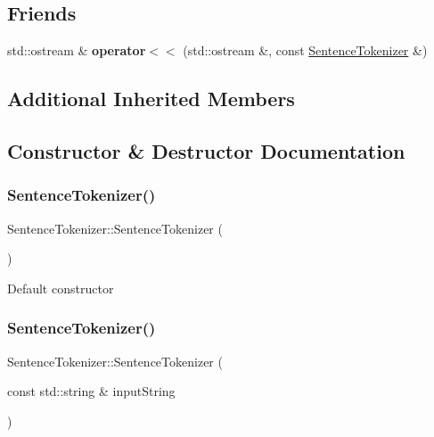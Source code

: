 \subsection*{Friends}
\begin{DoxyCompactItemize}
\item 
\mbox{\label{classSentenceTokenizer_a2998282df2f8bc7eb4c49617879f9256}} 
std\+::ostream \& {\bfseries operator$<$$<$} (std\+::ostream \&, const \hyperlink{classSentenceTokenizer}{Sentence\+Tokenizer} \&)
\end{DoxyCompactItemize}
\subsection*{Additional Inherited Members}


\subsection{Constructor \& Destructor Documentation}
\mbox{\label{classSentenceTokenizer_a7ac4c0f31e4066808cb2f4e8f1aee545}} 
\subsubsection{\texorpdfstring{Sentence\+Tokenizer()}{SentenceTokenizer()}\hspace{0.1cm}{\footnotesize\ttfamily [1/2]}}
{\footnotesize\ttfamily Sentence\+Tokenizer\+::\+Sentence\+Tokenizer (\begin{DoxyParamCaption}{ }\end{DoxyParamCaption})}

Default constructor \mbox{\label{classSentenceTokenizer_a3ac263cb539f5dd072931a4d9f134d74}} 
\subsubsection{\texorpdfstring{Sentence\+Tokenizer()}{SentenceTokenizer()}\hspace{0.1cm}{\footnotesize\ttfamily [2/2]}}
{\footnotesize\ttfamily Sentence\+Tokenizer\+::\+Sentence\+Tokenizer (\begin{DoxyParamCaption}\item[{const std\+::string \&}]{input\+String }\end{DoxyParamCaption})}

